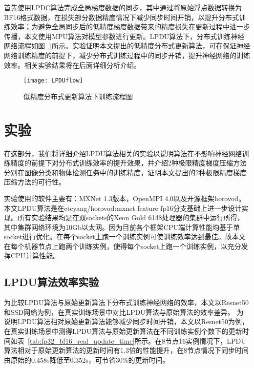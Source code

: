 首先使用LPDC算法完成全局梯度数据的同步，其中通过将原始浮点数据转换为BF16格式数据，在损失部分数据精度情况下减少同步时间开销，以提升分布式训练效率；为避免全局同步后的低精度梯度数据带来的精度损失在更新过程中进一步传播，本文使用MPU算法对模型参数进行更新。LPDU算法下，分布式训练神经网络流程如图~\ref{fig:LPDUflow}所示。实验证明本文提出的低精度分布式更新算法，可在保证神经网络训练精度的前提下，减少分布式训练过程中的同步开销，提升神经网络的训练效率。相关实验结果将在后面详细分析介绍。

\begin{figure}[htp]
\centering
\texttt{[image: LPDUflow]}
\caption{低精度分布式更新算法下训练流程图}
\label{fig:LPDUflow}
\end{figure}

\chapter{实验}

在这部分，我们将详细介绍LPDU算法相关的实验以说明算法在不影响神经网络训练精度的前提下对分布式训练效率的提升效果，并介绍2种极限精度梯度压缩方法分别在图像分类和物体检测任务中的训练精度，证明本文提出的2种极限精度梯度压缩方法的可行性。

实验使用的软件主要有：MXNet 1.3版本，OpenMPI 4.0以及开源框架horovod。本文LPDU算法是在ctcyang/horovod:mxnet feature fp16分支基础上进一步设计实现。所有实验结果均是在双sockets的Xeon Gold 6148处理器的集群中运行所得，其中集群网络环境为10Gb以太网。因为目前各个框架CPU端计算性能均基于单socket进行优化。在每个socket上跑一个训练实例可使训练效率达到最佳。故本文在每个机器节点上跑两个训练实例，使得每个socket上跑一个训练实例，以充分发挥CPU计算性能。

\section{LPDU算法效率实验}
为比较LPDU算法与原始更新算法下分布式训练神经网络的效率，本文以Resnet50和SSD网络为例，在真实训练场景中对比LPDU算法与原始算法的效率差异。
为说明LPDU算法相对原始更新算法能够减少同步时间开销，本文以Resnet50为例，在真实训练场景中测得LPDU算法与原始更新算法在不同训练实例个数下的更新时间如表~\ref{tab:fp32_bf16_real_update_time}所示。在8节点16实例情况下，LPDU算法相对于原始更新算法的更新时间有1.3倍的性能提升，在8节点情况下同步时间由原始的0.458s降低至0.352s，可节省30\%的更新时间。 

